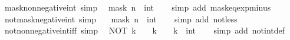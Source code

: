 \begin{isabellebody}
\endisatagproof
{\isafoldproof}%
%
\isadelimproof
\isanewline
%
\endisadelimproof
\isanewline
{}\isamarkupfalse%
\ mask{\isacharunderscore}{\kern0pt}nonnegative{\isacharunderscore}{\kern0pt}int\ {\isacharbrackleft}{\kern0pt}simp{\isacharbrackright}{\kern0pt}{\isacharcolon}{\kern0pt}\isanewline
\ \ {\isacartoucheopen}mask\ n\ {\isasymge}\ {\isacharparenleft}{\kern0pt}{}{\isacharcolon}{\kern0pt}{\isacharcolon}{\kern0pt}int{\isacharparenright}{\kern0pt}{\isacartoucheclose}\isanewline
%
\isadelimproof
\ \ %
\endisadelimproof
%
\isatagproof
{}\isamarkupfalse%
\ {\isacharparenleft}{\kern0pt}simp\ add{\isacharcolon}{\kern0pt}\ mask{\isacharunderscore}{\kern0pt}eq{\isacharunderscore}{\kern0pt}exp{\isacharunderscore}{\kern0pt}minus{\isacharunderscore}{\kern0pt}{}{\isacharparenright}{\kern0pt}%
\endisatagproof
{\isafoldproof}%
%
\isadelimproof
\isanewline
%
\endisadelimproof
\isanewline
{}\isamarkupfalse%
\ not{\isacharunderscore}{\kern0pt}mask{\isacharunderscore}{\kern0pt}negative{\isacharunderscore}{\kern0pt}int\ {\isacharbrackleft}{\kern0pt}simp{\isacharbrackright}{\kern0pt}{\isacharcolon}{\kern0pt}\isanewline
\ \ {\isacartoucheopen}{\isasymnot}\ mask\ n\ {\isacharless}{\kern0pt}\ {\isacharparenleft}{\kern0pt}{}{\isacharcolon}{\kern0pt}{\isacharcolon}{\kern0pt}int{\isacharparenright}{\kern0pt}{\isacartoucheclose}\isanewline
%
\isadelimproof
\ \ %
\endisadelimproof
%
\isatagproof
{}\isamarkupfalse%
\ {\isacharparenleft}{\kern0pt}simp\ add{\isacharcolon}{\kern0pt}\ not{\isacharunderscore}{\kern0pt}less{\isacharparenright}{\kern0pt}%
\endisatagproof
{\isafoldproof}%
%
\isadelimproof
\isanewline
%
\endisadelimproof
\isanewline
{}\isamarkupfalse%
\ not{\isacharunderscore}{\kern0pt}nonnegative{\isacharunderscore}{\kern0pt}int{\isacharunderscore}{\kern0pt}iff\ {\isacharbrackleft}{\kern0pt}simp{\isacharbrackright}{\kern0pt}{\isacharcolon}{\kern0pt}\isanewline
\ \ {\isacartoucheopen}NOT\ k\ {\isasymge}\ {}\ {\isasymlongleftrightarrow}\ k\ {\isacharless}{\kern0pt}\ {}{\isacartoucheclose}\ \ k\ {\isacharcolon}{\kern0pt}{\isacharcolon}{\kern0pt}\ int\isanewline
%
\isadelimproof
\ \ %
\endisadelimproof
%
\isatagproof
{}\isamarkupfalse%
\ {\isacharparenleft}{\kern0pt}simp\ add{\isacharcolon}{\kern0pt}\ not{\isacharunderscore}{\kern0pt}int{\isacharunderscore}{\kern0pt}def{\isacharparenright}{\kern0pt}%
\endisatagproof
{\isafoldproof}%
%
\isadelimproof
\isanewline
%
\endisadelimproof
\isanewline
{}\isamarkupfalse%

\end{isabellebody}
